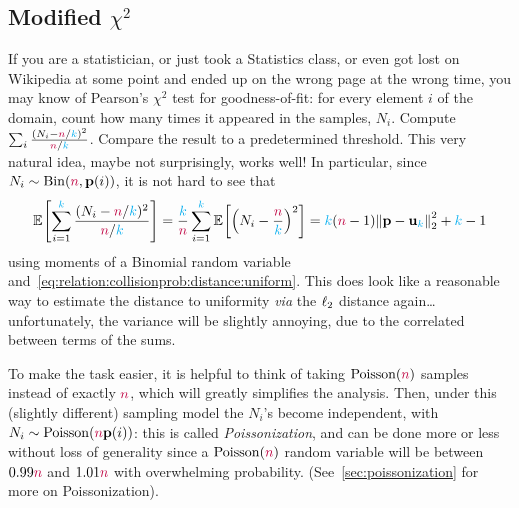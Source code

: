 \subsection{Modified $\chi^2$} If you are a statistician, or just took a Statistics class, or even got lost on Wikipedia at some point and ended up on the wrong page at the wrong time, you may know of Pearson's $\chi^2$ test for goodness-of-fit: for every element $i$ of the domain, count how many times it appeared in the samples, $N_i$. Compute $\sum_{i} \frac{(N_i-\ns/\ab)^2}{\ns/\ab}$. Compare the result to a predetermined threshold. This very natural idea, maybe not surprisingly, works well! In particular, since $N_i \sim \binomial{\ns}{\p(i)}$, it is not hard to see that
\[
\bEE{ \sum_{i=1}^\ab \frac{(N_i-\ns/\ab)^2}{\ns/\ab} } = \frac{\ab}{\ns}\sum_{i=1}^\ab \bEE{ \Paren{N_i-\frac{\ns}{\ab}}^2 } = \ab(\ns-1)\normtwo{\p-\uniform_\ab}^2 + \ab-1
\]
using moments of a Binomial random variable and~\cref{eq:relation:collisionprob:distance:uniform}. This does look like a reasonable way to estimate the distance to uniformity \emph{via} the $\lp[2]$ distance again\dots{} unfortunately, the variance will be slightly annoying, due to the correlated between terms of the sums.


To make the task easier, it is helpful to think of taking $\poisson{\ns}$ samples instead of exactly $\ns$, which will greatly simplifies the analysis. Then, under this (slightly different) sampling model the $N_i$'s become independent, with $N_i\sim\poisson{\ns\p(i)}$: this is called \emph{Poissonization}, and can be done more or less without loss of generality since a $\poisson{\ns}$ random variable will be between $0.99\ns$ and $1.01\ns$ with overwhelming probability. (See~\cref{sec:poissonization} for more on Poissonization).

